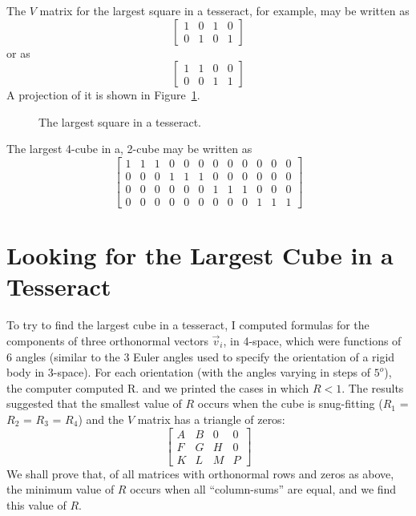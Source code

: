 The $V$ matrix for the largest square in a tesseract, for example, may
be written as
\begin{equation*}
\begin{bmatrix}
1 & 0 & 1 & 0 \\
0 & 1 & 0 & 1
\end{bmatrix}
\end{equation*}
or as
\begin{equation*}
\begin{bmatrix}
1 & 1 & 0 & 0 \\
0 & 0 & 1 & 1
\end{bmatrix}
\end{equation*}
A projection of it is shown in Figure~\ref{fig1}.
\begin{figure}
\begin{center}
\end{center}
\vspace{-0.2in}
\caption{The largest square in a tesseract.}
\label{fig1}
\end{figure}
The largest 4-cube in a, 2-cube may be written as
\begin{equation*}
\begin{bmatrix}
1 & 1 & 1 & 0 & 0 & 0 & 0 & 0 & 0 & 0 & 0 & 0 \\
0 & 0 & 0 & 1 & 1 & 1 & 0 & 0 & 0 & 0 & 0 & 0 \\
0 & 0 & 0 & 0 & 0 & 0 & 1 & 1 & 1 & 0 & 0 & 0 \\
0 & 0 & 0 & 0 & 0 & 0 & 0 & 0 & 0 & 1 & 1 & 1
\end{bmatrix}
\end{equation*}

\section*{Looking for the Largest Cube in a Tesseract}

To try to find the largest cube in a tesseract, I computed formulas for the
components of three orthonormal vectors $\vec{v}_i$, in 4-space, which were
functions of 6 angles (similar to the 3 Euler angles used to specify the
orientation of a rigid body in 3-space). For each orientation (with the
angles varying in steps of $5^o$), the computer computed R. and we printed
the cases in which $R < 1$. The results suggested that the smallest value of
$R$ occurs when the cube is snug-fitting ($R_1$ = $R_2$ = $R_3$ = $R_4$) and
the $V$ matrix has a triangle of zeros:
\begin{equation*}
\begin{bmatrix}
A & B & 0 & 0 \\
F & G & H & 0 \\
K & L & M & P
\end{bmatrix}
\end{equation*}
We shall prove that, of all matrices with orthonormal rows and zeros as
above, the minimum value of $R$ occurs when all ``column-sums'' are equal,
and we find this value of $R$.

